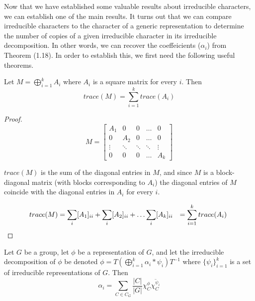 Now that we have established some valuable results about irreducible characters, we can establish one of the main results. It turns out that we can compare irreducible characters to the character of a generic representation to determine the number of copies of a given irreducible character in its irreducible decomposition. In other words, we can recover the coeffeicients ($\alpha_i$) from Theorem (1.18). In order to establish this, we first need the following useful theorems.

\begin{theorem}
	Let $M = \bigoplus_{i=1}^k A_i$ where $A_i$ is a square matrix for every $i$. Then $$trace(M) = \sum_{i=1}^k trace(A_i)$$
\end{theorem} 

\noindent \begin{proof} $$M = \begin{bmatrix}
						A_1 & 0 & 0 & \hdots & 0 \\
						0 & A_2 & 0 & \hdots & 0 \\
						\vdots & \ddots & \ddots & \ddots & \vdots \\
						0 & 0 & 0 & \hdots & A_k
					\end{bmatrix}$$

$trace(M)$ is the sum of the diagonal entries in $M$, and since $M$ is a block-diagonal matrix (with blocks corresponding to $A_i$) the diagonal entries of $M$ coincide with the diagonal entries in $A_i$ for every $i$.

\begin{equation}
	\begin{aligned}
		trace(M) &= \sum_i [A_1]_{ii} + \sum_i [A_2]_{ii} + \hdots \sum_i [A_k]_{ii} &= \sum_{i=1}^k trace(A_i) \hspace{1mm}
	\end{aligned}
\end{equation}
\end{proof}

\begin{theorem}
	Let $G$ be a group, let $\phi$ be a representation of $G$, and let the irreducible decomposition of $\phi$ be denoted $\phi = T \left( \bigoplus_{i=1}^k \alpha_i *\psi_i\right) T^{-1}$ where $\{\psi_i\}_{i=1}^k$ is a set of irreducible representations of $G$. Then $$\alpha_i = \sum_{C\in C_G} \frac{|C|}{|G|}\chi^\phi_C \overline{\chi^{\psi_i}_C}$$
\end{theorem}

